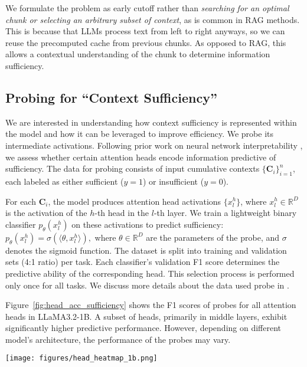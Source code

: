 We formulate the problem as early cutoff rather than \textit{searching for an optimal chunk or selecting an arbitrary subset of context}, as is common in RAG methods. This is because that LLMs process text from left to right anyways, so we can reuse the precomputed cache from previous chunks. As opposed to RAG, this allows a contextual understanding of the chunk to determine information sufficiency.


\subsection{Probing for ``Context Sufficiency''}
\label{sec:probing_sufficiency}

We are interested in understanding how context sufficiency is represented within the model and how it can be leveraged to improve efficiency. We probe its intermediate activations. Following prior work on neural network interpretability \citep{iti,deng2024language}, we assess whether certain attention heads encode information predictive of sufficiency. 
The data for probing consists of input cumulative contexts \(\{\mathbf{C}_i\}_{i=1}^n\), each labeled as either sufficient (\(y = 1\)) or insufficient (\(y = 0\)). 

\noindent\begin{minipage}[t]{0.48\textwidth}

For each \(\mathbf{C}_i\), the model produces attention head activations \(\{x_l^h\}\), where \(x_l^h \in \mathbb{R}^D\) is the activation of the \(h\)-th head in the \(l\)-th layer. We train a lightweight binary classifier \(p_\theta(x_l^h)\) on these activations to predict sufficiency:
$p_\theta(x_l^h) = \sigma(\langle \theta, x_l^h \rangle),$ where \(\theta \in \mathbb{R}^D\) are the parameters of the probe, and \(\sigma\) denotes the sigmoid function. The dataset is split into training and validation sets (4:1 ratio) per task. Each classifier's validation F1 score determines the predictive ability of the corresponding head. This selection process is performed only once for all tasks. We discuss more details about the data used probe in .

Figure~\ref{fig:head_acc_sufficiency} shows the F1 scores of probes for all attention heads in LLaMA3.2-1B. A subset of heads, primarily in middle layers, exhibit significantly higher predictive performance. However, depending on different model's architecture, the performance of the probes may vary.
\end{minipage}
\hfill
\begin{minipage}[t]{0.48\textwidth}
\centering
\vspace{-2mm}
\texttt{[image: figures/head\_heatmap\_1b.png]}
\vspace{-3mm}
\label{fig:head_acc_sufficiency}
\end{minipage}

